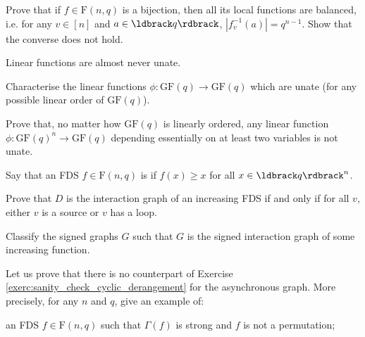 \documentclass[a4paper, 11pt]{book}
\numberwithin{equation}{section}
\theoremstyle{plain}
\newcommand{\degree}{d}
\newcommand{\inn}[1]{#1_\mathrm{in}}
\newcommand{\dIn}{\inn{\degree}}
\newcommand{\zero}[1]{#1^0}
\newcommand{\dInZero}{\zero{\dIn}}
\newcommand{\AGraph}{\Gamma}
\newcommand{\functions}{\mathrm{F}}
\newcommand{\GF}{\mathrm{GF}}
\renewcommand{\(}{\ldbrack}
\renewcommand{\)}{\rdbrack}
\newcommand{\BF}[1]{{\bf\boldmath{#1}\unboldmath}}
\begin{document}
\begin{exercises}
\item Prove that if $f \in \functions(n,q)$ is a bijection, then all its local functions are balanced, i.e. for any $v \in [n]$ and $a \in \(q\)$, $|f_v^{-1}(a)| = q^{n-1}$. Show that the converse does not hold.




\item Linear functions are almost never unate.
\begin{exercises}
	\item Characterise the linear functions $\phi: \GF(q) \to \GF(q)$ which are unate (for any possible linear order of $\GF(q)$).
	
	\item Prove that, no matter how $\GF(q)$ is linearly ordered, any linear function $\phi : \GF(q)^n \to \GF(q)$ depending essentially on at least two variables is not unate.
\end{exercises}

\item \label{exerc:increasing} Say that an FDS $f \in \functions(n,q)$ is \BF{increasing} if $f(x) \ge x$ for all $x \in \(q\)^n$. 
\begin{exercises}
	\item Prove that $D$ is the interaction graph of an increasing FDS if and only if for all $v$, either $v$  is a source or $v$ has a loop.

	\item Classify the signed graphs $G$ such that $G$ is the signed interaction graph of some increasing function.
\end{exercises}






\item Let us prove that there is no counterpart of Exercise \ref{exerc:sanity_check_cyclic_derangement} for the asynchronous graph. More precisely, for any $n$ and $q$, give an example of:
\begin{exercises}
	\item an FDS $f \in \functions(n,q)$ such that $\AGraph(f)$ is strong and $f$ is not a permutation;
	

\end{exercises}
\end{exercises}
\end{document}

